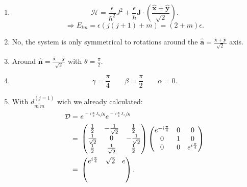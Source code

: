 \documentclass[notitlepage]{report}
\begin{document}
\begin{enumerate}[label=\alph*)]
	\item \[
		\mathcal{H}=\frac{\epsilon}{\hslash^2} J^2 + \frac{\epsilon}{\hslash} \boldsymbol{J} \cdot \left(\frac{\hat{\boldsymbol{x}}+\hat{\boldsymbol{y}}}{\sqrt{2} }\right) 
	.\] 
	\[
		\Rightarrow E_{lm}=\epsilon \left(j\left(j+1\right) + m\right)  =\left(2+m\right)\epsilon 
	.\] 
\item No, the system is only symmetrical to rotations around the $\hat{\boldsymbol{a}}=\frac{\hat{\boldsymbol{x}}+\hat{\boldsymbol{y}}}{\sqrt{2} }$ axis.
\item Around $\hat{\boldsymbol{n}}=\frac{\hat{\boldsymbol{x}}-\hat{\boldsymbol{y}}}{\sqrt{2}}$ with $\theta= \frac{\pi}{2}$.
\item \[
	\gamma= \frac{\pi}{4}\qquad\beta= \frac{\pi}{2}\qquad\alpha=0
.\] 
\item With $d_{m^\prime m}^{\left(j=1\right) }$ wich we already calculated:\\
	\begin{align*}
	\mathcal{D} =&\ e^{\sfrac{-i \frac{\pi}{2}J_y}{\hslash}}e^{\sfrac{-i \frac{\pi}{4}J_z}{\hslash}}\\
	 =&\ 
			\begin{pmatrix}
				\frac{1}{2}& -\frac{1}{\sqrt{2}} &\frac{1}{2} \\
				\frac{1}{\sqrt{2}} & 0 & -\frac{1}{\sqrt{2}}\\
				\frac{1}{2} & \frac{1}{\sqrt{2}} &\frac{1}{2} 
			\end{pmatrix}
			\begin{pmatrix}
				e^{-i \frac{\pi}{4}} & 0 & 0\\
				0 & 1 & 0\\
				0 & 0 & e^{i \frac{\pi}{4}}
			\end{pmatrix}\\
			 =&\ 
			\begin{pmatrix}
			e^{i \frac{\pi}{4}} & \sqrt{2}  & e\\
			 &  & \\
			 &  & 
			\end{pmatrix} 
	.\end{align*}
\end{enumerate}
\end{document}

